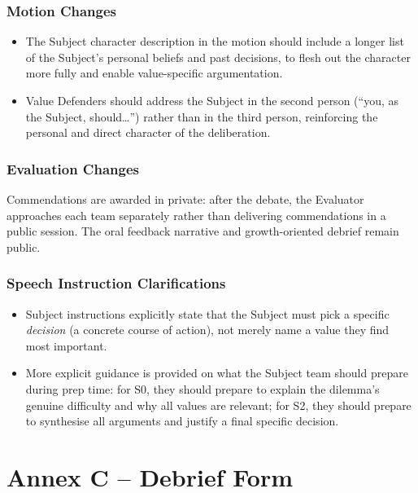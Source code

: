 \documentclass[12pt]{article}
\begin{document}
\subsubsection{Motion Changes}

\begin{itemize}
    \item The Subject character description in the motion should include a longer list of the Subject's personal beliefs and past decisions, to flesh out the character more fully and enable value-specific argumentation.
    \item Value Defenders should address the Subject in the second person (``you, as the Subject, should\ldots'') rather than in the third person, reinforcing the personal and direct character of the deliberation.
\end{itemize}

\subsubsection{Evaluation Changes}

Commendations are awarded in private: after the debate, the Evaluator approaches each team separately rather than delivering commendations in a public session. The oral feedback narrative and growth-oriented debrief remain public.

\subsubsection{Speech Instruction Clarifications}

\begin{itemize}
    \item Subject instructions explicitly state that the Subject must pick a specific \textit{decision} (a concrete course of action), not merely name a value they find most important.
    \item More explicit guidance is provided on what the Subject team should prepare during prep time: for S0, they should prepare to explain the dilemma's genuine difficulty and why all values are relevant; for S2, they should prepare to synthesise all arguments and justify a final specific decision.
\end{itemize}


\newpage

\section*{Annex C -- Debrief Form}
\end{document}
